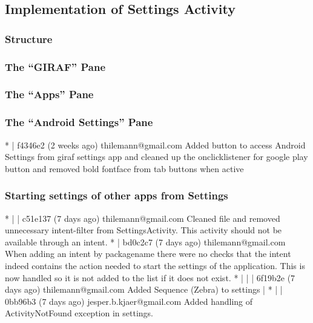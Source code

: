\subsection{Implementation of Settings Activity}

\subsubsection{Structure}

\subsubsection{The ``GIRAF'' Pane}


\subsubsection{The ``Apps'' Pane}


 \subsubsection{The ``Android Settings'' Pane}
 * | f4346e2 (2 weeks ago) thilemann@gmail.com Added button to access Android Settings from giraf settings app and cleaned up the onclicklistener for google play button and removed bold fontface from tab buttons when active\\
 
 \subsubsection{Starting settings of other apps from Settings}
 * | | c51e137 (7 days ago) thilemann@gmail.com Cleaned file and removed unnecessary intent-filter from SettingsActivity. This activity should not be available through an intent.
 * | bd0c2c7 (7 days ago) thilemann@gmail.com When adding an intent by packagename there were no checks that the intent indeed contains the action needed to start the settings of the application. This is now
 handled so it is not added to the list if it does not exist.
 * | | | 6f19b2e (7 days ago) thilemann@gmail.com Added Sequence (Zebra) to settings
 | * | | 0bb96b3 (7 days ago) jesper.b.kjaer@gmail.com Added handling of ActivityNotFound exception in settings.